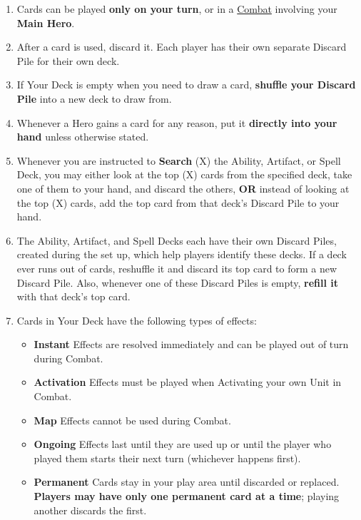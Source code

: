\begin{enumerate}
  \item Cards can be played \textbf{only on your turn}, or in a \hyperlink{Combat}{Combat} involving your \textbf{Main Hero}.
  \item After a card is used, discard it.
    Each player has their own separate Discard Pile for their own deck.
  \item If Your Deck is empty when you need to draw a card, \textbf{shuffle your Discard Pile} into a new deck to draw from.
  \item Whenever a Hero gains a card for any reason, put it \textbf{directly into your hand} unless otherwise stated.
  \item Whenever you are instructed to \textbf{Search} (X) the Ability, Artifact, or Spell Deck, you may either look at the top (X) cards from the specified deck, take one of them to your hand, and discard the others, \textbf{OR} instead of looking at the top (X) cards, add the top card from that deck’s Discard Pile to your hand.
  \item The Ability, Artifact, and Spell Decks each have their own Discard Piles, created during the set up, which help players identify these decks.
    If a deck ever runs out of cards, reshuffle it and discard its top card to form a new Discard Pile.
    Also, whenever one of these Discard Piles is empty, \textbf{refill it} with that deck’s top card.
  \item Cards in Your Deck have the following types of effects:
  \begin{itemize}
        \item \textbf{Instant}  Effects are resolved immediately and can be played out of turn during Combat.
        \item \textbf{Activation}  Effects must be played when Activating your own Unit in Combat.
        \item \textbf{Map}  Effects cannot be used during Combat.
        \item \textbf{Ongoing}  Effects last until they are used up or until the player who played them starts their next turn (whichever happens first).
        \item \textbf{Permanent}  Cards stay in your play area until discarded or replaced.
          \textbf{Players may have only one permanent card at a time}; playing another discards the first.
    \end{itemize}
\end{enumerate}

